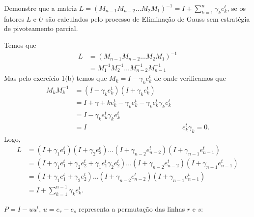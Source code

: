 \documentclass[a4paper,12pt, leqno, answers]{exam}
\begin{document}
\begin{questions}
    \question Demonstre que a matriz $L = \left( M_{n - 1} M_{n - 2} \ldots M_2 M_1 \right)^{-1} = I + \sum_{k = 1}^n \gamma_k e_k^t$, se os fatores $L$ e $U$ s\~{a}o calculados pelo processo de Elimina\c{c}\~{a}o de Gauss sem estrat\'{e}gia de pivoteamento parcial.
    \begin{solution}
        Temos que
        \begin{align*}
            L &= \left( M_{n - 1} M_{n - 2} \ldots M_2 M_1 \right)^{-1} \\
            &= M_1^{-1} M_2^{-1} \ldots M_{n - 2}^{-1} M_{n - 1}^{-1}
        \end{align*}
        Mas pelo exerc\'{i}cio 1(b) temos que $M_k = I - \gamma_k e_k^t$ de onde verificamos que
        \begin{align*}
            M_k M_k^{-1} &= \left( I - \gamma_k e_k^t \right) \left( I + \gamma_k e_k^t \right) \\
            &= I + \gamma+k e_k^t - \gamma_k e_k^t - \gamma_k e_k^t \gamma_k e_k^t \\
            &= I - \gamma_k e_k^t \gamma_k e_k^t \\
            &= I && e_k^t \gamma_k = 0.
        \end{align*}
        Logo,
        \begin{align*}
            L&= \left( I + \gamma_1 e_1^t \right) \left( I + \gamma_2 e_2^t \right) \ldots \left( I + \gamma_{n - 2} e_{n - 2}^t \right) \left( I + \gamma_{n - 1} e_{n - 1}^t \right) \\
            &= \left( I + \gamma_1 e_1^t + \gamma_2 e_2^t + \gamma_1 e_1^t \gamma_2 e_2^t \right) \ldots \left( I + \gamma_{n - 2} e_{n - 2}^t \right) \left( I + \gamma_{n - 1} e_{n - 1}^t \right) \\
            &= \left( I + \gamma_1 e_1^t + \gamma_2 e_2^t \right) \ldots \left( I + \gamma_{n - 2} e_{n - 2}^t \right) \left( I + \gamma_{n - 1} e_{n - 1}^t \right) \\
            &= I + \sum_{k = 1}^{n - 1} \gamma_k e_k^t.
        \end{align*}
    \end{solution}

    \question $P = I - u u^t$, $u = e_r - e_s$ representa a permuta\c{c}\~{a}o das linhas $r$ e $s$:
\end{questions}
\end{document}
